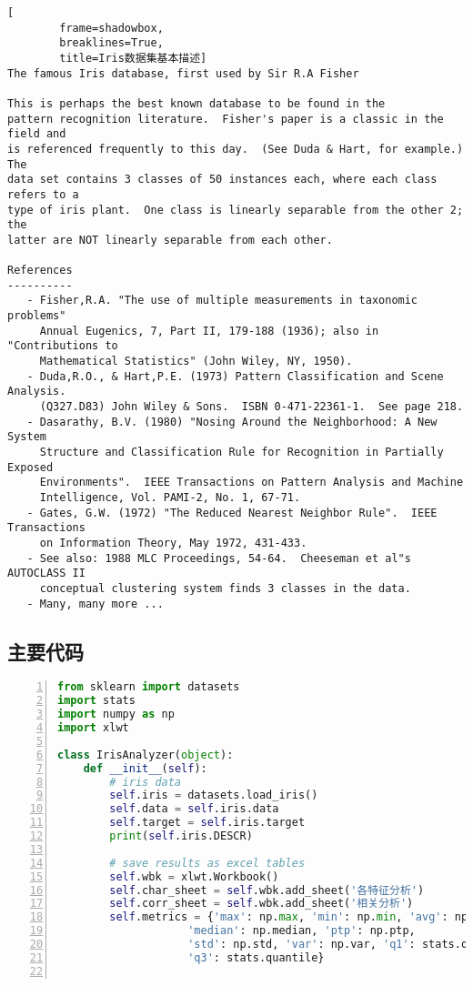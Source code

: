 \documentclass[12pt,a4paper]{article}
\theoremstyle{definition}
\begin{document}
\begin{appendix}
\begin{lstlisting}[
		frame=shadowbox,
		breaklines=True,
		title=Iris数据集基本描述]
The famous Iris database, first used by Sir R.A Fisher

This is perhaps the best known database to be found in the
pattern recognition literature.  Fisher's paper is a classic in the field and
is referenced frequently to this day.  (See Duda & Hart, for example.)  The
data set contains 3 classes of 50 instances each, where each class refers to a
type of iris plant.  One class is linearly separable from the other 2; the
latter are NOT linearly separable from each other.

References
----------
   - Fisher,R.A. "The use of multiple measurements in taxonomic problems"
     Annual Eugenics, 7, Part II, 179-188 (1936); also in "Contributions to
     Mathematical Statistics" (John Wiley, NY, 1950).
   - Duda,R.O., & Hart,P.E. (1973) Pattern Classification and Scene Analysis.
     (Q327.D83) John Wiley & Sons.  ISBN 0-471-22361-1.  See page 218.
   - Dasarathy, B.V. (1980) "Nosing Around the Neighborhood: A New System
     Structure and Classification Rule for Recognition in Partially Exposed
     Environments".  IEEE Transactions on Pattern Analysis and Machine
     Intelligence, Vol. PAMI-2, No. 1, 67-71.
   - Gates, G.W. (1972) "The Reduced Nearest Neighbor Rule".  IEEE Transactions
     on Information Theory, May 1972, 431-433.
   - See also: 1988 MLC Proceedings, 54-64.  Cheeseman et al"s AUTOCLASS II
     conceptual clustering system finds 3 classes in the data.
   - Many, many more ...
		\end{lstlisting}
		
	\subsection{主要代码}
		\label{apd:code}
		
		\begin{lstlisting}[language=Python,
		numbers=left,
		keywordstyle=\color{blue!70},
		commentstyle=\color{green!99!blue!99},
		frame=shadowbox,
		breaklines=True,
		title=Iris数据集探索代码]
from sklearn import datasets
import stats
import numpy as np
import xlwt

class IrisAnalyzer(object):
    def __init__(self):
        # iris data
        self.iris = datasets.load_iris()
        self.data = self.iris.data
        self.target = self.iris.target
        print(self.iris.DESCR)

        # save results as excel tables
        self.wbk = xlwt.Workbook()
        self.char_sheet = self.wbk.add_sheet('各特征分析')
        self.corr_sheet = self.wbk.add_sheet('相关分析')
        self.metrics = {'max': np.max, 'min': np.min, 'avg': np.mean,
                    'median': np.median, 'ptp': np.ptp,
                    'std': np.std, 'var': np.var, 'q1': stats.quantile,
                    'q3': stats.quantile}


\end{lstlisting}
\end{appendix}
\end{document}
